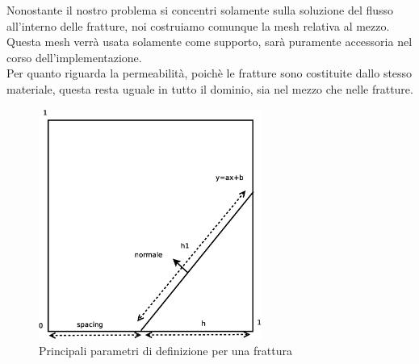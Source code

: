 \par \noindent Nonostante il nostro problema si concentri solamente sulla soluzione del flusso all'interno delle fratture, noi costruiamo comunque la mesh relativa al mezzo. Questa mesh verrà usata solamente come supporto, sarà puramente accessoria nel corso dell'implementazione. \\
 \noindent Per quanto riguarda la permeabilità, poichè le fratture sono costituite dallo stesso materiale, questa resta uguale in tutto il dominio, sia nel mezzo che nelle fratture. 
\begin{figure}[htbp]
\includegraphics[width=0.65\textwidth]{img/mesh.eps}
\caption{Principali parametri di definizione per una frattura}
\end{figure}


